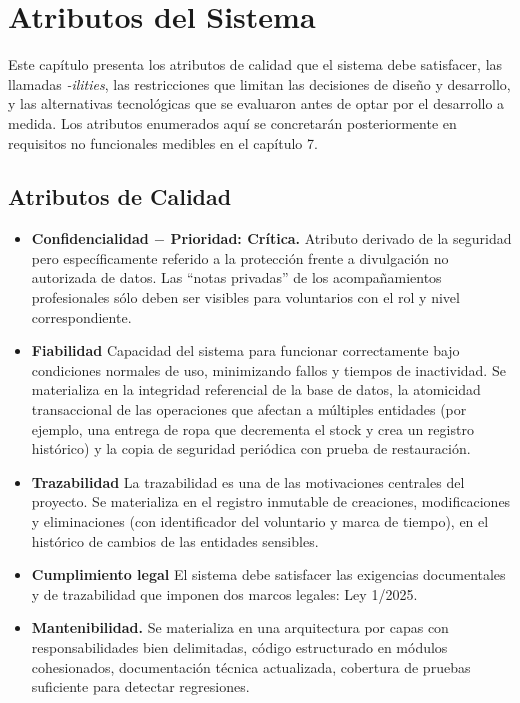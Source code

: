 \section{Atributos del Sistema}
Este capítulo presenta los atributos de calidad que el sistema debe satisfacer, 
las llamadas \textit{-ilities}, las restricciones que limitan las decisiones de
diseño y desarrollo, y las alternativas tecnológicas que se evaluaron antes de
optar por el desarrollo a medida. Los atributos enumerados aquí se concretarán
posteriormente en requisitos no funcionales medibles en el capítulo 7.

\subsection{Atributos de Calidad}
\begin{itemize}
    \item \textbf{Confidencialidad $-$ Prioridad: Crítica.} 
    Atributo derivado de la seguridad pero específicamente referido a la
    protección frente a divulgación no autorizada de datos. Las ``notas privadas''
    de los acompañamientos profesionales sólo deben ser visibles para voluntarios con el rol y 
    nivel correspondiente.

    \item \textbf{Fiabilidad} 
    Capacidad del sistema para funcionar correctamente bajo 
    condiciones normales de uso, minimizando fallos y tiempos de inactividad. Se materializa en la
    integridad referencial de la base de datos, la atomicidad transaccional de
    las operaciones que afectan a múltiples entidades (por ejemplo, una entrega
    de ropa que decrementa el stock y crea un registro histórico) y la copia de
    seguridad periódica con prueba de restauración.

    \item \textbf{Trazabilidad} 
    La trazabilidad es una de las 
    motivaciones centrales del proyecto. Se materializa en el registro inmutable de creaciones,
    modificaciones y eliminaciones (con identificador del voluntario y marca de
    tiempo), en el histórico de cambios de las entidades sensibles.

    \item \textbf{Cumplimiento legal} 
    El sistema debe satisfacer las exigencias documentales y de trazabilidad que
    imponen dos marcos legales: Ley 1/2025.

    \item \textbf{Mantenibilidad.}  
    Se materializa en una arquitectura por capas con responsabilidades bien delimitadas, código
    estructurado en módulos cohesionados, documentación técnica actualizada,
    cobertura de pruebas suficiente para detectar regresiones.


\end{itemize}
